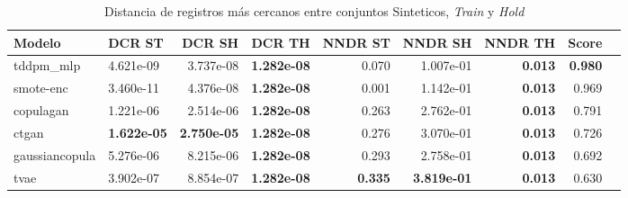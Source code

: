 \begin{table}[H]
\centering
\caption{Distancia de registros más cercanos entre conjuntos Sinteticos, \emph{Train} y \emph{Hold}}
\label{table-dcr-economicos-a-2}
\begin{tabular}{|l|l|r|r|r|r|r|r|r|}
\hline
\rowcolor[gray]{0.8}
Modelo & DCR ST & DCR SH & DCR TH & NNDR ST & NNDR SH & NNDR TH & \textbf{Score} \\
\hline tddpm\_mlp & 4.621e-09 & \cellcolor[rgb]{0.9, 0.54, 0.52} 3.737e-08 & \bfseries 1.282e-08 & 0.070 & 1.007e-01 & \bfseries 0.013 & \bfseries 0.980 \\
\hline smote-enc & \cellcolor[rgb]{0.9, 0.54, 0.52} 3.460e-11 & 4.376e-08 & \bfseries 1.282e-08 & 0.001 & 1.142e-01 & \bfseries 0.013 & 0.969 \\
\hline copulagan & 1.221e-06 & 2.514e-06 & \bfseries 1.282e-08 & 0.263 & 2.762e-01 & \bfseries 0.013 & 0.791 \\
\hline ctgan & \bfseries 1.622e-05 & \bfseries 2.750e-05 & \bfseries 1.282e-08 & 0.276 & 3.070e-01 & \bfseries 0.013 & 0.726 \\
\hline gaussiancopula & 5.276e-06 & 8.215e-06 & \bfseries 1.282e-08 & 0.293 & 2.758e-01 & \bfseries 0.013 & 0.692 \\
\hline tvae & 3.902e-07 & 8.854e-07 & \bfseries 1.282e-08 & \bfseries 0.335 & \bfseries 3.819e-01 & \bfseries 0.013 & 0.630 \\
\hline
\end{tabular}
\end{table}
